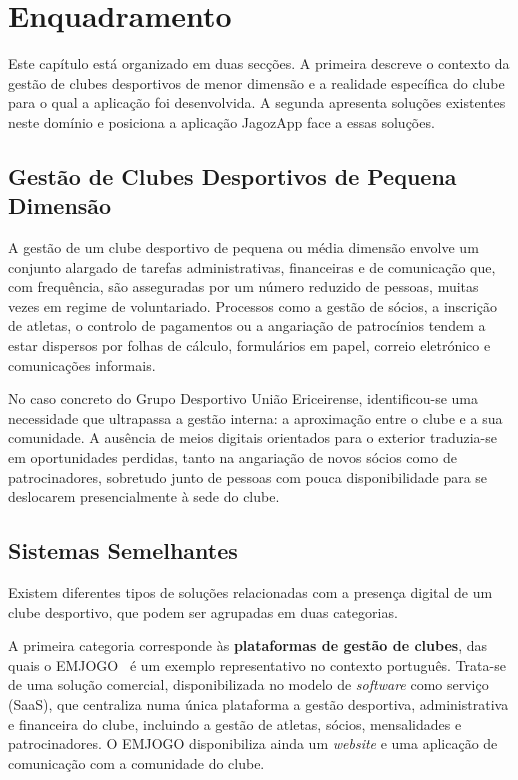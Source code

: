 \chapter{Enquadramento}

Este capítulo está organizado em duas secções. A primeira descreve o contexto 
da gestão de clubes desportivos de menor dimensão e a realidade específica do 
clube para o qual a aplicação foi desenvolvida. A segunda apresenta soluções 
existentes neste domínio e posiciona a aplicação JagozApp face a essas 
soluções.

\section{Gestão de Clubes Desportivos de Pequena Dimensão}

A gestão de um clube desportivo de pequena ou média dimensão envolve um 
conjunto alargado de tarefas administrativas, financeiras e de comunicação que, 
com frequência, são asseguradas por um número reduzido de pessoas, muitas vezes 
em regime de voluntariado. Processos como a gestão de sócios, a inscrição de 
atletas, o controlo de pagamentos ou a angariação de patrocínios tendem a estar 
dispersos por folhas de cálculo, formulários em papel, correio eletrónico e 
comunicações informais.

No caso concreto do Grupo Desportivo União Ericeirense, identificou-se uma 
necessidade que ultrapassa a gestão interna: a aproximação entre o clube e a 
sua comunidade. A ausência de meios digitais orientados para o exterior 
traduzia-se em oportunidades perdidas, tanto na angariação de novos sócios como 
de patrocinadores, sobretudo junto de pessoas com pouca disponibilidade para se 
deslocarem presencialmente à sede do clube.

\section{Sistemas Semelhantes}

Existem diferentes tipos de soluções relacionadas com a presença digital de um 
clube desportivo, que podem ser agrupadas em duas categorias.

A primeira categoria corresponde às \textbf{plataformas de gestão de clubes}, 
das quais o EMJOGO~\cite{emjogo} é um exemplo representativo no contexto 
português. Trata-se de uma solução comercial, disponibilizada no modelo de 
\textit{software} como serviço (SaaS), que centraliza numa única plataforma a 
gestão desportiva, administrativa e financeira do clube, incluindo a gestão de 
atletas, sócios, mensalidades e patrocinadores. O EMJOGO disponibiliza ainda um 
\textit{website} e uma aplicação de comunicação com a comunidade do clube.

